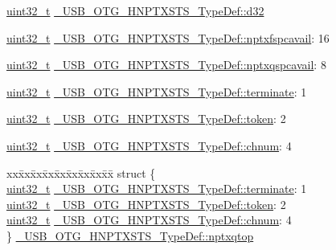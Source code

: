 \begin{DoxyCompactItemize}
\begin{tabbing}
\end{tabbing}\item 
\hyperlink{stdint_8h_a435d1572bf3f880d55459d9805097f62}{uint32\-\_\-t} \hyperlink{group___u_s_b___o_t_g___d_r_i_v_e_r_ga45ca79f639e05d3ece30649050c81084}{\-\_\-\-U\-S\-B\-\_\-\-O\-T\-G\-\_\-\-H\-N\-P\-T\-X\-S\-T\-S\-\_\-\-Type\-Def\-::d32}
\item 
\hyperlink{stdint_8h_a435d1572bf3f880d55459d9805097f62}{uint32\-\_\-t} \hyperlink{group___u_s_b___o_t_g___d_r_i_v_e_r_gac775d30f4d6ea8497522eea1c8f1dd99}{\-\_\-\-U\-S\-B\-\_\-\-O\-T\-G\-\_\-\-H\-N\-P\-T\-X\-S\-T\-S\-\_\-\-Type\-Def\-::nptxfspcavail}\-: 16
\item 
\hyperlink{stdint_8h_a435d1572bf3f880d55459d9805097f62}{uint32\-\_\-t} \hyperlink{group___u_s_b___o_t_g___d_r_i_v_e_r_gac7c8e3ec8eb043384cd26aaf67009f46}{\-\_\-\-U\-S\-B\-\_\-\-O\-T\-G\-\_\-\-H\-N\-P\-T\-X\-S\-T\-S\-\_\-\-Type\-Def\-::nptxqspcavail}\-: 8
\item 
\hyperlink{stdint_8h_a435d1572bf3f880d55459d9805097f62}{uint32\-\_\-t} \hyperlink{group___u_s_b___o_t_g___d_r_i_v_e_r_ga15d8c9921780fc2eabe7052d5aa94ca1}{\-\_\-\-U\-S\-B\-\_\-\-O\-T\-G\-\_\-\-H\-N\-P\-T\-X\-S\-T\-S\-\_\-\-Type\-Def\-::terminate}\-: 1
\item 
\hyperlink{stdint_8h_a435d1572bf3f880d55459d9805097f62}{uint32\-\_\-t} \hyperlink{group___u_s_b___o_t_g___d_r_i_v_e_r_gae107b5535ca75e09689f2e18a7f0a7d9}{\-\_\-\-U\-S\-B\-\_\-\-O\-T\-G\-\_\-\-H\-N\-P\-T\-X\-S\-T\-S\-\_\-\-Type\-Def\-::token}\-: 2
\item 
\hyperlink{stdint_8h_a435d1572bf3f880d55459d9805097f62}{uint32\-\_\-t} \hyperlink{group___u_s_b___o_t_g___d_r_i_v_e_r_gaa358189a93a955a21e5b3cfdb0b1a08d}{\-\_\-\-U\-S\-B\-\_\-\-O\-T\-G\-\_\-\-H\-N\-P\-T\-X\-S\-T\-S\-\_\-\-Type\-Def\-::chnum}\-: 4
\item 
\begin{tabbing}
xx\=xx\=xx\=xx\=xx\=xx\=xx\=xx\=xx\=\kill
struct \{\\
\>\hyperlink{stdint_8h_a435d1572bf3f880d55459d9805097f62}{uint32\_t} \hyperlink{group___u_s_b___o_t_g___d_r_i_v_e_r_ga15d8c9921780fc2eabe7052d5aa94ca1}{\_USB\_OTG\_HNPTXSTS\_TypeDef::terminate}: 1\\
\>\hyperlink{stdint_8h_a435d1572bf3f880d55459d9805097f62}{uint32\_t} \hyperlink{group___u_s_b___o_t_g___d_r_i_v_e_r_gae107b5535ca75e09689f2e18a7f0a7d9}{\_USB\_OTG\_HNPTXSTS\_TypeDef::token}: 2\\
\>\hyperlink{stdint_8h_a435d1572bf3f880d55459d9805097f62}{uint32\_t} \hyperlink{group___u_s_b___o_t_g___d_r_i_v_e_r_gaa358189a93a955a21e5b3cfdb0b1a08d}{\_USB\_OTG\_HNPTXSTS\_TypeDef::chnum}: 4\\
\} \hyperlink{group___u_s_b___o_t_g___d_r_i_v_e_r_gac60267dff234320797a8a09809cc7b43}{\_USB\_OTG\_HNPTXSTS\_TypeDef::nptxqtop}\\


\end{tabbing}
\end{DoxyCompactItemize}
